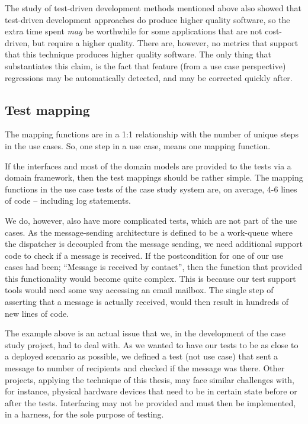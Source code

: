 \noindent The study of test-driven development methods mentioned above also showed that test-driven development approaches do produce higher quality software, so the extra time spent \emph{may} be worthwhile for some applications that are not cost-driven, but require a higher quality. There are, however, no metrics that support that this technique produces higher quality software. The only thing that substantiates this claim, is the fact that feature (from a use case perspective) regressions may be automatically detected, and may be corrected quickly after.

\subsection{Test mapping}
The mapping functions are in a 1:1 relationship with the number of unique steps in the use cases. So, one step in a use case, means one mapping function.\medskip

\noindent If the interfaces and most of the domain models are provided to the tests via a domain framework, then the test mappings should be rather simple. The mapping functions in the use case tests of the case study system are, on average, 4-6 lines of code -- including log statements.\medskip

\noindent We do, however, also have more complicated tests, which are not part of the use cases. As the message-sending architecture is defined to be a work-queue where the dispatcher is decoupled from the message sending, we need additional support code to check if a message is received. If the postcondition for one of our use cases had been; ``Message is received by contact'', then the function that provided this functionality would become quite complex. This is because our test support tools would need some way accessing an email mailbox. The single step of asserting that a message is actually received, would then result in hundreds of new lines of code.\medskip

\noindent The example above is an actual issue that we, in the development of the case study project, had to deal with. As we wanted to have our tests to be as close to a deployed scenario as possible, we defined a test (not use case) that sent a message to number of recipients and checked if the message was there. Other projects, applying the technique of this thesis, may face similar challenges with, for instance, physical hardware devices that need to be in certain state before or after the tests. Interfacing may not be provided and must then be implemented, in a harness, for the sole purpose of testing.\medskip

